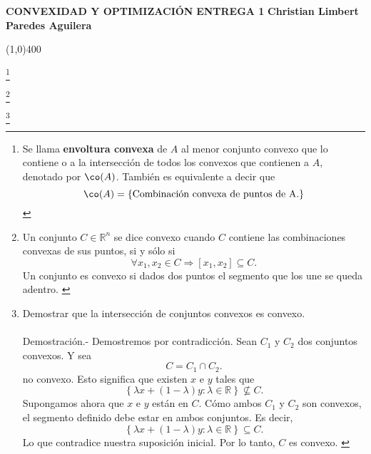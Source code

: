 \center \textbf{CONVEXIDAD Y OPTIMIZACIÓN}
\center \textbf{\Large ENTREGA 1}
\center \textbf{ \textbf{Christian Limbert Paredes Aguilera}}

\line(1,0){400}

\footnote{
    Se llama \textbf{envoltura convexa} de $A$ al menor conjunto convexo que lo contiene o a la intersección de todos los convexos que contienen a $A$, denotado por $\co(A)$.
    También es equivalente a decir que
    $$\co(A)=\left\{\mbox{Combinación convexa de puntos de A.}\right\}$$
\label{uno}}

\footnote{
    Un conjunto $C\in \mathbb{R}^n$ se dice convexo cuando $C$ contiene las combinaciones convexas de sus puntos, si y sólo si
    $$\forall x_1,x_2\in C \Rightarrow \left[x_1,x_2\right]\subseteq C.$$
    Un conjunto es convexo si dados dos puntos el segmento que los une se queda adentro.
\label{dos}}

\footnote{
    Demostrar que la intersección de conjuntos convexos es convexo.\\\\
	Demostración.-\; Demostremos por contradicción. Sean $C_1$ y $C_2$ dos conjuntos convexos. Y sea 
	$$C=C_1\cap C_2.$$
	no convexo. Esto significa que existen $x$ e $y$ tales que 
	$$\left\{\lambda x + (1-\lambda)y:\lambda\in \mathbb{R}\right\}\not\subseteq C.$$ 
	Supongamos ahora que $x$ e $y$ están en $C$. Cómo ambos $C_1$ y $C_2$ son convexos, el segmento definido debe estar en ambos conjuntos. Es decir,
	$$\left\{\lambda x + (1-\lambda)y:\lambda\in \mathbb{R}\right\}\subseteq C.$$ 
	Lo que contradice nuestra suposición inicial. Por lo tanto, $C$ es convexo.
\label{tres}}

